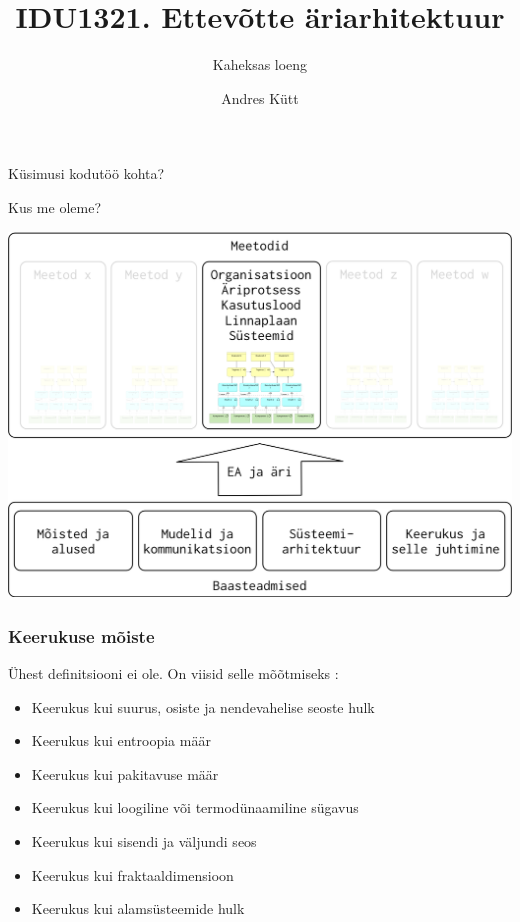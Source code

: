 \documentclass{beamer}
\title{IDU1321. Ettevõtte äriarhitektuur}
\subtitle{Kaheksas loeng}
\author{Andres Kütt}
\institute{Arhitekt}
\begin{document}
\begin{frame}
\titlepage
\end{frame}


\begin{frame}[standout]
Küsimusi kodutöö kohta?
\end{frame}


\begin{frame}{Kus me oleme?}
	\begin{center}
		\includegraphics[width=.8\textwidth]{aine_struktuur}
	\end{center}
\end{frame}

\begin{frame}[fragile]
  \frametitle{Keerukuse mõiste}
  Ühest definitsiooni ei ole. On viisid selle mõõtmiseks \cite{mitchell2009complexity}:
	\begin{itemize}
		\item Keerukus kui suurus, osiste ja nendevahelise seoste hulk
		\item Keerukus kui entroopia määr
		\item Keerukus kui pakitavuse määr
		\item Keerukus kui loogiline või termodünaamiline sügavus
		\item Keerukus kui sisendi ja väljundi seos
		\item Keerukus kui fraktaaldimensioon
		\item Keerukus kui alamsüsteemide hulk
		
	\end{itemize}
\end{frame}
\end{document}
